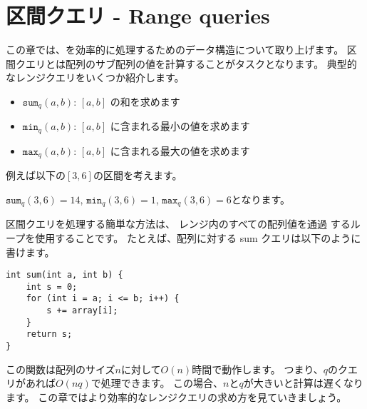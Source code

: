 \chapter{区間クエリ - Range queries}


この章では、を効率的に処理するためのデータ構造について取り上げます。
区間クエリとは配列のサブ配列の値を計算することがタスクとなります。
典型的なレンジクエリをいくつか紹介します。

\begin{itemize}
\item $\texttt{sum}_q(a,b)$: $[a,b]$ の和を求めます
\item $\texttt{min}_q(a,b)$: $[a,b]$ に含まれる最小の値を求めます
\item $\texttt{max}_q(a,b)$: $[a,b]$ に含まれる最大の値を求めます
\end{itemize}

例えば以下の$[3,6]$の区間を考えます。
\begin{center}
\end{center}
$\texttt{sum}_q(3,6)=14$,
$\texttt{min}_q(3,6)=1$, $\texttt{max}_q(3,6)=6$となります。

区間クエリを処理する簡単な方法は、
レンジ内のすべての配列値を通過 するループを使用することです。
たとえば、配列に対する sum クエリは以下のように書けます。

\begin{lstlisting}
int sum(int a, int b) {
    int s = 0;
    for (int i = a; i <= b; i++) {
        s += array[i];
    }
    return s;
}
\end{lstlisting}

この関数は配列のサイズ$n$に対して$O(n)$時間で動作します。
つまり、$q$のクエリがあれば$O(nq)$で処理できます。
この場合、$n$と$q$が大きいと計算は遅くなります。
この章ではより効率的なレンジクエリの求め方を見ていきましょう。

